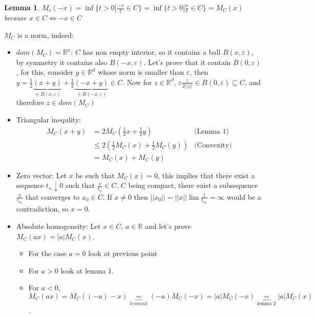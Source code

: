 \documentclass[11pt]{article}
\newtheorem{thm}{Lemma}
\begin{document}
\begin{thm}
\(M_c(-x) = \inf \{ t > 0 | \frac {-x}t \in C\} = \inf \{ t > 0 | \frac {x}t \in C\} = M_C(x)\) because \(x \in C \iff -x \in C\)
\end{thm}

\(M_C\) is a norm, indeed:

\begin{itemize}
\item \(dom(M_C) = \mathbb R^n\): \(C\) has non empty interior, so it contains a ball \(B(x, \varepsilon)\), by symmetry it contains also \(B(-x, \varepsilon)\). Let's prove that it contain \(B(0, \varepsilon)\), for this, consider \(y \in \mathbb R^d\) whose norm is smaller than \(\varepsilon\), then \(y = \frac12 \underbrace{(x + y)}_{\in B(x, \varepsilon)} + \frac12 \underbrace{(-x + y)}_{\in B(-x, \varepsilon)} \in C\). Now for \(z \in \mathbb{R}^d\), \(\varepsilon\frac{z}{2||z||} \in B(0, \varepsilon) \subseteq C\), and therefore \(z \in dom(M_C)\)
\item Triangular inequlity:
\begin{align*}
M_C(x+y) &= 2 M_C(\frac12 x + \frac12 y)  &\text{(Lemma 1)}
\\&\le 2 (\frac12 M_C(x) + \frac12 M_C(y)) &\text{(Convexity)}
\\&= M_C(x) + M_C(y)
\end{align*}
\item Zero vector: Let \(x\) be such that \(M_C(x) = 0\), this implies that there exist a sequence \(t_n \downarrow 0\) such that \(\frac{x}{t_n} \in C\). \(C\) being compact, there exist a subsequence \(\frac x{t_{n_k}}\) that converges to \(x_0 \in C\). If \(x \ne 0\) then \(||x_0|| = ||x|| \lim \frac1{t_{n_k}} = \infty\) would be a contradiction, so \(x = 0\).
\item Absolute homogeneity: Let \(x \in C\), \(a \in \mathbb{R}\) and let's prove \(M_C(ax) = |a|M_C(x)\).

\begin{itemize}
\item For the case \(a = 0\) look at previous point
\item For \(a > 0\) look at lemma 1.
\item For \(a < 0\), \(M_C(ax) = M_C( (-a) -x) \underbrace{=}_{lemma 1} (-a) M_C(-x) = |a| M_C(-x) \underbrace{=}_{\text{lemma 2}} |a| M_C(x)\).
\end{itemize}
\end{itemize}
\end{document}
